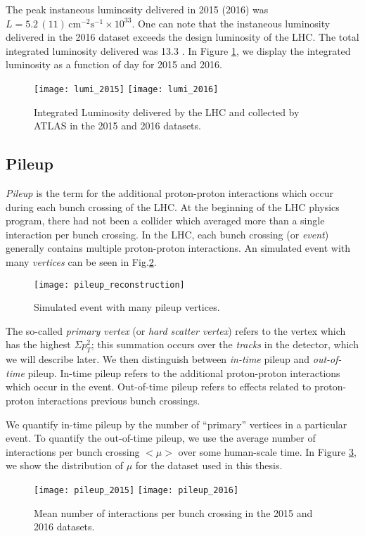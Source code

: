 The peak instaneous luminosity delivered in 2015 (2016) was $L = 5.2 \, (11) \, \text{cm}^{-2} \text{s}^{-1} \times 10^{33} $.
One can note that the instaneous luminosity delivered in the 2016 dataset exceeds the design luminosity of the LHC.
The total integrated luminosity delivered was 13.3 \ifb.
In Figure \ref{fig:lumi}, we display the integrated luminosity as a function of day for 2015 and 2016.
\begin{figure}
\caption{Integrated Luminosity delivered by the LHC and collected by ATLAS in the 2015 and 2016 datasets.}\label{fig:lumi}
\texttt{[image: lumi\_2015]}
\texttt{[image: lumi\_2016]}
\end{figure}

\subsection{Pileup}

\textit{Pileup} is the term for the additional proton-proton interactions which occur during each bunch crossing of the LHC.
At the beginning of the LHC physics program, there had not been a collider which averaged more than a single interaction per bunch crossing.
In the LHC, each bunch crossing (or \textit{event})  generally contains multiple proton-proton interactions.
An simulated event with many \textit{vertices} can be seen in Fig.\ref{fig:pileup_reconstruction}.
\begin{figure}
\caption{Simulated event with many pileup vertices.}\label{fig:pileup_reconstruction}
\texttt{[image: pileup\_reconstruction]}
\end{figure}
The so-called \textit{primary vertex} (or \textit{hard scatter vertex}) refers to the vertex which has the highest $\Sigma p_T^2$;  this summation occurs over the \textit{tracks} in the detector, which we will describe later\cite{ATL-INDET-PUB-2009-001}.
We then distinguish between \textit{in-time} pileup and \textit{out-of-time} pileup.
In-time pileup refers to the additional proton-proton interactions which occur in the event.
Out-of-time pileup refers to effects related to proton-proton interactions previous bunch crossings.

We quantify in-time pileup by the number of ``primary''\footnotemark \xspace vertices in a particular event.
To quantify the out-of-time pileup, we use the average number of interactions per bunch crossing $<\mu>$ over some human-scale time.
In Figure \ref{fig:pileup}, we show the distribution of $\mu$ for the dataset used in this thesis.
\begin{figure}
\caption{Mean number of interactions per bunch crossing in the 2015 and 2016 datasets.}\label{fig:pileup}
\texttt{[image: pileup\_2015]}
\texttt{[image: pileup\_2016]}
\end{figure}

